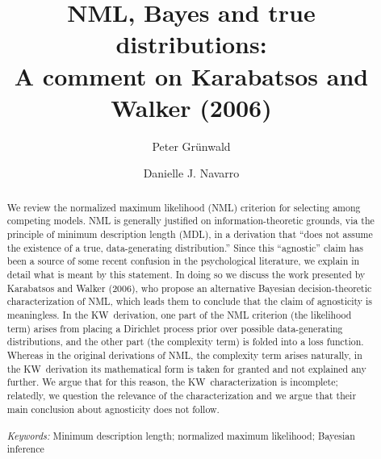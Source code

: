 \documentclass[authoryear]{elsarticle}
\newcommand{\kw}{KW}
\begin{document}
\begin{frontmatter}

\title{NML, Bayes and true distributions: \\A comment on Karabatsos and Walker (2006)}

\journal{}

\author[cwi]{Peter Gr\"{u}nwald}

\author[adel]{Danielle J. Navarro}


\address[cwi]{Centrum voor Wiskunde en Informatica, Netherlands}
\address[adel]{School of Psychology, University of Adelaide, Australia}



	\begin{abstract}
        We review the normalized maximum likelihood (NML)
        criterion for selecting among competing models. NML is
        generally justified on information-theoretic grounds, via the
        principle of minimum description length (MDL), in a derivation
        that ``does not assume the existence of a true,
        data-generating distribution.'' Since this
        ``agnostic'' claim has been a source of some recent confusion in
        the psychological literature, we explain in detail what is meant by
        this statement. In doing so we discuss the work presented by
        Karabatsos and Walker (2006), who propose an alternative Bayesian
        decision-theoretic characterization of NML, which leads them
        to conclude that the claim of agnosticity is meaningless.  In
        the \kw\ derivation, one part of the NML criterion (the
        likelihood term) arises from placing a Dirichlet process prior
        over possible data-generating distributions, and the other
        part (the complexity term) is folded into a loss function.
        Whereas in the original derivations of NML, the complexity
        term arises naturally, in the \kw\ derivation its mathematical
        form is taken for granted and not explained any further. We
        argue that for this reason, the \kw\ characterization is
        incomplete; relatedly, we question the relevance of the
        characterization and we argue that their main conclusion about
        agnosticity does
        not follow. \\ \\
        {\it Keywords:} Minimum description length; normalized maximum
        likelihood; Bayesian inference \normalsize\\ \\
	\end{abstract}

\end{frontmatter}
\end{document}
